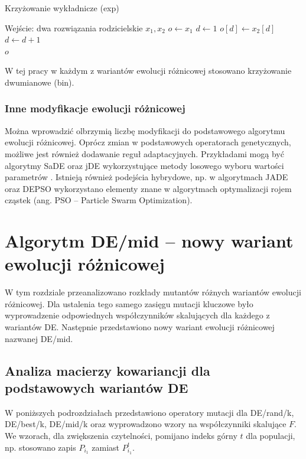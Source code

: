 \documentclass[a4paper,onecolumn,oneside,12pt,wide,floatssmall]{mwrep}
\theoremstyle{definition}
\theoremstyle{plain}%
\theoremstyle{remark}
\begin{document}
\begin{algorithm}[H]
\caption{Krzyżowanie wykładnicze (exp)}
\label{algorithm:exp}
\begin{algorithmic}[1]
\State Wejście: dwa rozwiązania rodzicielskie $x_1, x_2$ 
\State $o \gets x_1$
\State $d \gets 1$
    \State $o[d] \gets x_2[d]$ 
    \State $d \gets d + 1$
\EndWhile \\
\Return $o$
\end{algorithmic}
\end{algorithm}

W tej pracy w każdym z wariantów ewolucji różnicowej stosowano krzyżowanie dwumianowe (bin).

\subsection{Inne modyfikacje ewolucji różnicowej}

Można wprowadzić olbrzymią liczbę modyfikacji do podstawowego algorytmu ewolucji różnicowej.
Oprócz zmian w podstawowych operatorach genetycznych, możliwe jest również dodawanie reguł adaptacyjnych.
Przykładami mogą być algorytmy SaDE oraz jDE wykorzystujące metody losowego wyboru
wartości parametrów \cite{brest}. Istnieją również podejścia hybrydowe, np. w algorytmach JADE \cite{jade} oraz 
DEPSO \cite{depso} wykorzystano elementy znane w algorytmach optymalizacji rojem cząstek (ang. PSO -- Particle Swarm Optimization).

\chapter{Algorytm DE/mid -- nowy wariant ewolucji różnicowej}
\label{chap:de_mid}

W tym rozdziale przeanalizowano rozkłady mutantów różnych wariantów ewolucji różnicowej.
Dla ustalenia tego samego zasięgu mutacji kluczowe było wyprowadzenie odpowiednych współczynników skalujących
dla każdego z wariantów DE. Następnie przedstawiono nowy wariant ewolucji różnicowej nazwanej DE/mid.

\section{Analiza macierzy kowariancji dla podstawowych wariantów DE}

W poniższych podrozdziałach przedstawiono operatory mutacji dla DE/rand/k, DE/best/k, DE/mid/k 
oraz wyprowadzono wzory na współczynniki skalujące $F$. We wzorach, dla zwiększenia
czytelności, pomijano indeks górny $t$ dla populacji, np. stosowano zapis $P_{i_1}$ 
zamiast $P_{i_1}^t$.
\end{document}
